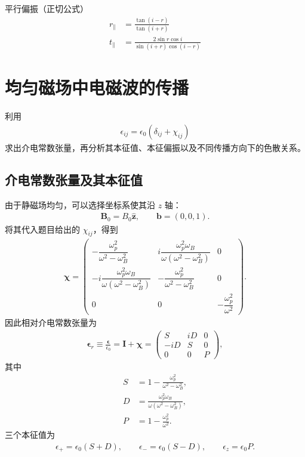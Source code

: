 \documentclass{article}
\begin{document}
平行偏振（正切公式）
\[
\boxed{
\begin{aligned}
r_\parallel&=\frac{\tan(i-r)}{\tan(i+r)}\\[6pt]
t_\parallel&=\frac{2\sin r\cos i}
{\sin(i+r)\cos(i-r)}
\end{aligned}
}
\]
\section{均匀磁场中电磁波的传播}

利用
\begin{align}
    \epsilon_{ij}=\epsilon_0(\delta_{ij}+\chi_{ij})
\end{align}
求出介电常数张量，再分析其本征值、本征偏振以及不同传播方向下的色散关系。

\subsection{介电常数张量及其本征值}

由于静磁场均匀，可以选择坐标系使其沿 $z$ 轴：
\begin{align}
    \mathbf B_0=B_0\hat{\mathbf z},\qquad
    \mathbf b=(0,0,1).
\end{align}
将其代入题目给出的 $\chi_{ij}$，得到
\begin{align}
    \boldsymbol\chi
    =\begin{pmatrix}
    -\dfrac{\omega_p^2}{\omega^2-\omega_B^2}
    &i\dfrac{\omega_p^2\omega_B}{\omega(\omega^2-\omega_B^2)}&0\\[8pt]
    -i\dfrac{\omega_p^2\omega_B}{\omega(\omega^2-\omega_B^2)}
    &-\dfrac{\omega_p^2}{\omega^2-\omega_B^2}&0\\[8pt]
    0&0&-\dfrac{\omega_p^2}{\omega^2}
    \end{pmatrix}.
\end{align}
因此相对介电常数张量为
\begin{align}
    \boldsymbol\epsilon_r
    \equiv\frac{\boldsymbol\epsilon}{\epsilon_0}
    =\mathbf I+\boldsymbol\chi
    =\begin{pmatrix}
    S&iD&0\\
    -iD&S&0\\
    0&0&P
    \end{pmatrix},
\end{align}
其中
\begin{align}
    S&=1-\frac{\omega_p^2}{\omega^2-\omega_B^2},\\
    D&=\frac{\omega_p^2\omega_B}{\omega(\omega^2-\omega_B^2)},\\
    P&=1-\frac{\omega_p^2}{\omega^2}.
\end{align}
三个本征值为
\begin{align}
    \boxed{\epsilon_+=\epsilon_0(S+D),\qquad
    \epsilon_-=\epsilon_0(S-D),\qquad
    \epsilon_z=\epsilon_0P.}
\end{align}
\end{document}

